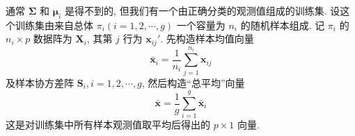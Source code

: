 通常 $\boldsymbol{\Sigma}$ 和 $\boldsymbol{\mu}_i$ 是得不到的, 但我们有一个由正确分类的观测值组成的训练集. 设这个训练集由来自总体 $\pi_i(i=1,2,\cdots,g)$ 一个容量为 $n_i$ 的随机样本组成. 记 $\pi_i$ 的 $n_i\times p$ 数据阵为 $\mathbf{X}_i$, 其第 $j$ 行为 $\mathbf{x}_{ij}'$. 先构造样本均值向量
\[
\bar{\mathbf{x}}_i=\frac{1}{n_i}\sum_{j=1}^{n_i}\mathbf{x}_{ij}
\]
及样本协方差阵 $\mathbf{S}_i, i=1,2,\cdots,g$, 然后构造“总平均”向量
\[
\bar{\mathbf{x}}=\frac{1}{g}\sum_{i=1}^{g}\bar{\mathbf{x}}_i
\]
这是对训练集中所有样本观测值取平均后得出的 $p\times 1$ 向量.
